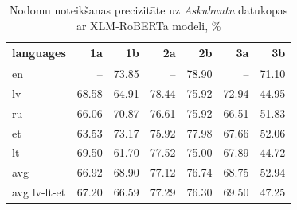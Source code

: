 \begin{table}[htbp]
  \centering
  \caption{Nodomu noteikšanas precizitāte uz \textit{Askubuntu} datukopas ar XLM-RoBERTa modeli, \%}
    \begin{tabular}{lrrrrrr}\toprule
    languages & 1a & 1b & 2a & 2b & 3a & 3b \\\midrule
    en    &   --    & \cellcolor[rgb]{ .694,  .784,  .898}73.85 &   --    & \cellcolor[rgb]{ .353,  .541,  .776}78.90 &   --    & \cellcolor[rgb]{ .882,  .914,  .965}71.10 \\
    lv    & \cellcolor[rgb]{ .984,  .965,  .976}68.58 & \cellcolor[rgb]{ .984,  .878,  .89}64.91 & \cellcolor[rgb]{ .384,  .565,  .788}78.44 & \cellcolor[rgb]{ .557,  .686,  .851}75.92 & \cellcolor[rgb]{ .757,  .827,  .922}72.94 & \cellcolor[rgb]{ .973,  .416,  .424}44.95 \\
    ru    & \cellcolor[rgb]{ .984,  .906,  .918}66.06 & \cellcolor[rgb]{ .898,  .925,  .969}70.87 & \cellcolor[rgb]{ .51,  .651,  .831}76.61 & \cellcolor[rgb]{ .557,  .686,  .851}75.92 & \cellcolor[rgb]{ .984,  .918,  .929}66.51 & \cellcolor[rgb]{ .976,  .576,  .584}51.83 \\
    et    & \cellcolor[rgb]{ .984,  .847,  .859}63.53 & \cellcolor[rgb]{ .741,  .816,  .914}73.17 & \cellcolor[rgb]{ .557,  .686,  .851}75.92 & \cellcolor[rgb]{ .416,  .588,  .8}77.98 & \cellcolor[rgb]{ .984,  .945,  .957}67.66 & \cellcolor[rgb]{ .976,  .58,  .588}52.06 \\
    lt    & \cellcolor[rgb]{ .988,  .988,  1}69.50 & \cellcolor[rgb]{ .98,  .804,  .816}61.70 & \cellcolor[rgb]{ .447,  .608,  .812}77.52 & \cellcolor[rgb]{ .62,  .729,  .871}75.00 & \cellcolor[rgb]{ .984,  .949,  .961}67.89 & \cellcolor[rgb]{ .973,  .412,  .42}44.72 \\\midrule
    avg   & \cellcolor[rgb]{ .984,  .925,  .937}66.92 & \cellcolor[rgb]{ .984,  .973,  .984}68.90 & \cellcolor[rgb]{ .475,  .627,  .82}77.12 & \cellcolor[rgb]{ .502,  .647,  .831}76.74 & \cellcolor[rgb]{ .984,  .969,  .98}68.75 & \cellcolor[rgb]{ .976,  .6,  .612}52.94 \\
    avg lv-lt-et & \cellcolor[rgb]{ .984,  .933,  .945}67.20 & \cellcolor[rgb]{ .984,  .918,  .929}66.59 & \cellcolor[rgb]{ .463,  .62,  .816}77.29 & \cellcolor[rgb]{ .529,  .667,  .839}76.30 & \cellcolor[rgb]{ .988,  .988,  1}69.50 & \cellcolor[rgb]{ .973,  .467,  .478}47.25 \\\bottomrule
    \end{tabular}%
  \label{tab:askubuntu-xlm}%
\end{table}%



